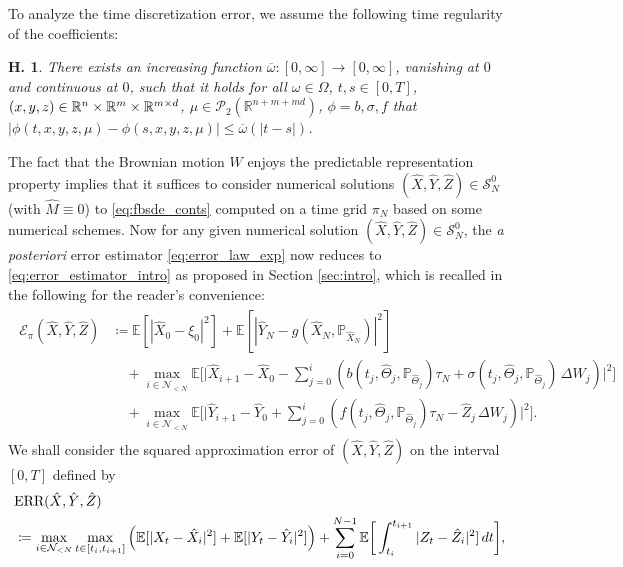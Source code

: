 \documentclass[11pt]{article}
\numberwithin{equation}{section}
\newtheorem{Assumption}{H.\!\!}
\theoremstyle{definition}
\theoremstyle{remark}
\def\to{\rightarrow}
\def\ol{\overline} \def\cl{\centerline}   \def\ul{\underline}
\def\Om{\Omega}  \def\om{\omega} %
\def\l{\label}  \def\f{\frac}  \def\fa{\forall}
\def\cE{\mathcal{E}}
\def\cN{\mathcal{N}}
\def\cP{\mathcal{P}}
\def\cS{\mathcal{S}}
\def\sE{{\mathbb{E}}}
\def\sP{\mathbb{P}}
\def\sR{{\mathbb R}}
\newcommand{\err}{\textnormal{ERR}}
\begin{document}
To analyze the time discretization error, we  assume the following time regularity of the coefficients:

\begin{Assumption}\l{assum:time_reg}
There exists an increasing function $\ol{\om}: [0,\infty] \to [0, \infty]$,
vanishing at $0$ and continuous at $0$,
such that 
it holds for  all
$\om\in \Om$, $t,s\in [0,T]$,
 $(x,y,z)\in  \sR^n\t \sR^m\t \sR^{m\t d}$,
 $\mu\in \cP_2(\sR^{n+m+md})$,
 $\phi=b,\sigma,f$ that
 $ |\phi(t,x,y,z,\mu)-\phi(s,x,y,z,\mu)|\le \ol{\om}(|t-s|)$.
\end{Assumption}

The fact that the Brownian motion $W$ enjoys the  predictable representation property
implies that it suffices to consider numerical solutions $(\hat{X},\hat{Y},\hat{Z})\in\cS^0_N$ (with $\hat{M}\equiv 0$) to \eqref{eq:fbsde_conts}
 computed on a time  grid $\pi_N$ 
 based on some numerical schemes.
 Now for any given numerical solution $(\hat{X},\hat{Y},\hat{Z})\in\cS^0_N$,
 the \textit{a posteriori} error estimator 
 \eqref{eq:error_law_exp} now 
reduces to \eqref{eq:error_estimator_intro} as proposed in Section \ref{sec:intro},
which is recalled in the following for the  reader's convenience:
\begin{align}\l{eq:error_law_conts}
\begin{split}
\cE_\pi(\hat{X},\hat{Y},\hat{Z})
&\coloneqq
\sE[|\hat{X}_0-\xi_0|^2]
+
\sE[|\hat{Y}_N-g(\hat{X}_N,\sP_{\hat{X}_N})|^2]
\\
&\quad +
\max_{i\in \cN_{<N}}
\sE
\bigg[
\bigg|
\hat{X}_{i+1}
-\hat{X}_{0}
-\sum_{j=0}^i
\left(
b(t_{j},\hat{\Theta}_{j},\sP_{\hat{\Theta}_{j}})\tau_N  +
\sigma (t_j,\hat{\Theta}_j,\sP_{\hat{\Theta}_j})\, \Delta W_j
\right)
\bigg|^2
\bigg]\\
&\quad +
\max_{i\in \cN_{<N}}
\sE\bigg[
\bigg|
\hat{Y}_{i+1}-\hat{Y}_0
+\sum_{j=0}^{i}
\left(
f(t_{j},\hat{\Theta}_{j}, \sP_{\hat{\Theta}_{j}})\tau_N- \hat{Z}_j\,\Delta W_j
\right)
\bigg|^2
\bigg].
\end{split}
\end{align} 
We shall consider 
 the squared approximation error
 of $(\hat{X},\hat{Y},\hat{Z})$
 on the interval $[0,T]$ defined by
\begin{align}\l{eq:error_T}
\begin{split}
&\err(\hat{X},\hat{Y},\hat{Z})
\\
&\coloneqq \max_{i\in \cN_{<N}}
\max_{t\in [t_i,t_{i+1}]}
\left(
\sE[|
X_t
-\hat{X}_{i}|^2]
+
\sE[|
{Y}_t
-\hat{Y}_{i}|^2]
\right)
+
\sum_{i=0}^{N-1}
\sE\bigg[
\int_{t_i}^{t_{i+1}}
|{Z}_{t}
-\hat{Z}_{i}|^2
]
\,dt\bigg],
\end{split}
\end{align}
\end{document}
